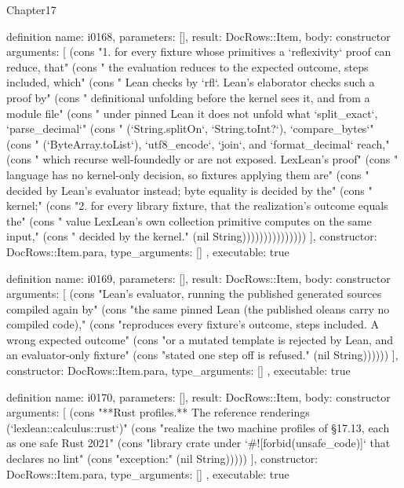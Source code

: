 \begin{lexlean}{Chapter17}
\begin{semanticmodule}
definition{
  name: i0168,
  parameters: [],
  result: DocRows::Item,
  body: constructor{
    arguments: [
      (cons "1. for every fixture whose primitives a `reflexivity` proof can reduce, that" (cons "   the evaluation reduces to the expected outcome, steps included, which" (cons "   Lean checks by `rfl`. Lean's elaborator checks such a proof by" (cons "   definitional unfolding before the kernel sees it, and from a module file" (cons "   under pinned Lean it does not unfold what `split_exact`, `parse_decimal`" (cons "   (`String.splitOn`, `String.toInt?`), `compare_bytes`" (cons "   (`ByteArray.toList`), `utf8_encode`, `join`, and `format_decimal` reach," (cons "   which recurse well-foundedly or are not exposed. LexLean's proof" (cons "   language has no kernel-only decision, so fixtures applying them are" (cons "   decided by Lean's evaluator instead; byte equality is decided by the" (cons "   kernel;" (cons "2. for every library fixture, that the realization's outcome equals the" (cons "   value LexLean's own collection primitive computes on the same input," (cons "   decided by the kernel." (nil String)))))))))))))))
    ],
    constructor: DocRows::Item.para,
    type_arguments: []
  },
  executable: true
}

definition{
  name: i0169,
  parameters: [],
  result: DocRows::Item,
  body: constructor{
    arguments: [
      (cons "Lean's evaluator, running the published generated sources compiled again by" (cons "the same pinned Lean (the published oleans carry no compiled code)," (cons "reproduces every fixture's outcome, steps included. A wrong expected outcome" (cons "or a mutated template is rejected by Lean, and an evaluator-only fixture" (cons "stated one step off is refused." (nil String))))))
    ],
    constructor: DocRows::Item.para,
    type_arguments: []
  },
  executable: true
}

definition{
  name: i0170,
  parameters: [],
  result: DocRows::Item,
  body: constructor{
    arguments: [
      (cons "**Rust profiles.** The reference renderings (`lexlean::calculus::rust`)" (cons "realize the two machine profiles of §17.13, each as one safe Rust 2021" (cons "library crate under `#![forbid(unsafe_code)]` that declares no lint" (cons "exception:" (nil String)))))
    ],
    constructor: DocRows::Item.para,
    type_arguments: []
  },
  executable: true
}


\end{semanticmodule}
\end{lexlean}
